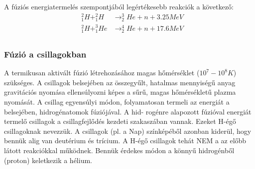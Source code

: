 \documentclass[../main.tex]{subfiles}
\begin{document}
A fúziós energiatermelés szempontjából legértékesebb reakciók a következő:
\begin{equation}
    \begin{aligned}
        &^2_1H + ^2_1H &\rightarrow ^3_2He + n + 3.25 MeV \\
        &^2_1H + ^3_1He &\rightarrow ^4_2He + n + 17.6 MeV \\
    \end{aligned}
\end{equation}

\subsubsection*{Fúzió a csillagokban}
A termikusan aktivált fúzió létrehozásához magas hőmérséklet ($10^7 - 10^8 K$) szükséges.
A csillagok belsejében az összegyűlt, hatalmas mennyiségű anyag gravitációs nyomása
ellensúlyozni képes a sűrű, magas hőmérsékletű plazma nyomását. A csillag egyensúlyi
módon, folyamatosan termeli az energiát a belsejében, hidrogénatomok fúziójával. A hid-
rogénre alapozott fúzióval energiát termelő csillagok a csillagfejlődés kezdeti szakaszában
vannak. Ezeket H-égő csillagoknak nevezzük.
A csillagok (pl. a Nap) színképéből azonban kiderül, hogy bennük alig van deutérium
és trícium. A H-égő csillagok tehát NEM a az előbb látott reakciókkal működnek. Bennük
érdekes módon a könnyű hidrogénből (proton) keletkezik a hélium.
\end{document}
